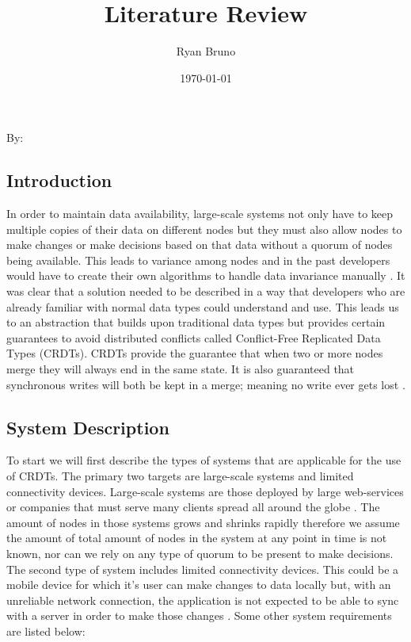 \documentclass{article}
\title{Literature Review}
\author{Ryan Bruno}
\date{\today}
\renewcommand{\maketitle}{
    \begin{center}
        \Huge\textbf{\thetitle}
    \end{center}
    \begin{multicols}{2}
        \begin{flushright}
        By: \theauthor
        \end{flushright}

        \columnbreak
        
        \thedate
    \end{multicols}
}
\begin{document}
\maketitle

\begin{multicols}{2}
\begin{refsection}

\section*{Introduction}

In order to maintain data availability, large-scale systems not only have to keep multiple copies of their data on different nodes but they must also allow nodes to make changes or make decisions based on that data without a quorum of nodes being available. This leads to variance among nodes and in the past developers would have to create their own algorithms to handle data invariance manually \cite{kleppmann_conflict-free_2017}. It was clear that a solution needed to be described in a way that developers who are already familiar with normal data types could understand and use. This leads us to an abstraction that builds upon traditional data types but provides certain guarantees to avoid distributed conflicts called Conflict-Free Replicated Data Types (CRDTs). CRDTs provide the guarantee that when two or more nodes merge they will always end in the same state. It is also guaranteed that synchronous writes will both be kept in a merge; meaning no write ever gets lost \cite{shapiro_comprehensive_2011}.

\subsection*{System Description}

To start we will first describe the types of systems that are applicable for the use of CRDTs. The primary two targets are large-scale systems and limited connectivity devices. Large-scale systems are those deployed by large web-services or companies that must serve many clients spread all around the globe \cite{tao_merging_2015} \cite{balegas_making_2016}. The amount of nodes in those systems grows and shrinks rapidly therefore we assume the amount of total amount of nodes in the system at any point in time is not known, nor can we rely on any type of quorum to be present to make decisions. The second type of system includes limited connectivity devices. This could be a mobile device for which it's user can make changes to data locally but, with an unreliable network connection, the application is not expected to be able to sync with a server in order to make those changes \cite{perkins_simba:_2015}. Some other system requirements are listed below:


\end{refsection}
\end{multicols}
\end{document}
